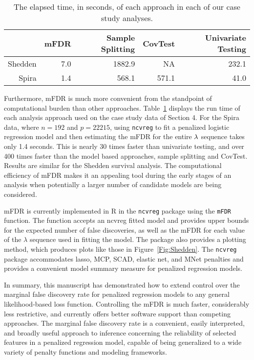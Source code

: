 \begin{table}[ht]
 \caption{\label{Tab:time} The elapsed time, in seconds, of each approach in each of our case study analyses.}
\centering
\begin{tabular}{rrrrr}
  \hline
 & mFDR & Sample Splitting & CovTest & Univariate Testing \\ 
  \hline
	Shedden & 7.0 & 1882.9 & NA & 232.1 \\
Spira & 1.4 & 568.1 & 571.1 & 41.0 \\ 
   \hline
\end{tabular}
\end{table}

Furthermore, mFDR is much more convenient from the standpoint of computational burden than other approaches.  Table~\ref{Tab:time} displays the run time of each analysis approach used on the case study data of Section 4. For the Spira data, where $n = 192$ and $p =22215$, using {\tt ncvreg} to fit a penalized logistic regression model and then estimating the mFDR for the entire $\lambda$ sequence takes only 1.4 seconds. This is nearly 30 times faster than univariate testing, and over 400 times faster than the model based approaches, sample splitting and CovTest.  Results are similar for the Shedden survival analysis.  The computational efficiency of mFDR makes it an appealing tool during the early stages of an analysis when potentially a larger number of candidate models are being considered.

mFDR is currently implemented in R in the {\tt ncvreg} package \citep{Breheny2011} using the {\tt mFDR} function. The function accepts an ncvreg fitted model and provides upper bounds for the expected number of false discoveries, as well as the mFDR for each value of the $\lambda$ sequence used in fitting the model.  The package also provides a plotting method, which produces plots like those in Figure~\ref{Fig:Shedden}.  The {\tt ncvreg} package accommodates lasso, MCP, SCAD, elastic net, and MNet \citep{Huang2016} penalties and provides a convenient model summary measure for penalized regression models.

In summary, this manuscript has demonstrated how to extend control over the marginal false discovery rate for penalized regression models to any general likelihood-based loss function.  Controlling the mFDR is much faster, considerably less restrictive, and currently offers better software support than competing approaches.  The marginal false discovery rate is a convenient, easily interpreted, and broadly useful approach to inference concerning the reliability of selected features in a penalized regression model, capable of being generalized to a wide variety of penalty functions and modeling frameworks.
